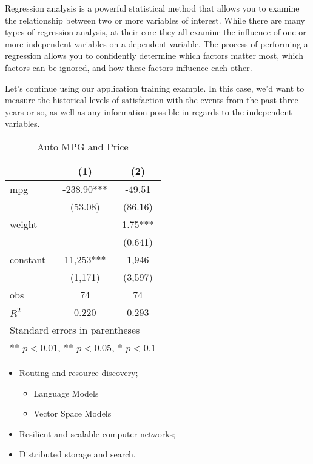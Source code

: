 \documentclass[en,hazy,blue,screen,14pt]{elegantnote}
\begin{document}
Regression analysis is a powerful statistical method that allows you to examine the relationship between two or more variables of interest. While there are many types of regression analysis, at their core they all examine the influence of one or more independent variables on a dependent variable. The process of performing a regression allows you to confidently determine which factors matter most, which factors can be ignored, and how these factors influence each other.

Let's continue using our application training example. In this case, we'd want to measure the historical levels of satisfaction with the events from the past three years or so, as well as any information possible in regards to the independent variables. 

\begin{table}[htbp]
  \small
  \centering
  \caption{Auto MPG and Price \label{tab:reg}}
    \begin{tabular}{lcc}
    \toprule
                    &       (1)         &        (2)      \\
    \midrule
    mpg             &    -238.90***     &      -49.51     \\
                    &     (53.08)       &      (86.16)    \\
    weight          &                   &      1.75***    \\
                    &                   &      (0.641)    \\
    constant        &     11,253***     &       1,946     \\
                    &     (1,171)       &      (3,597)   \\
    obs             &        74         &         74     \\
    $R^2$           &      0.220        &       0.293    \\
    \bottomrule
    \multicolumn{3}{l}{\scriptsize Standard errors in parentheses} \\
    \multicolumn{3}{l}{\scriptsize *** $p<0.01$, ** $p<0.05$, * $p<0.1$} \\
    \end{tabular}%
\end{table}%


\begin{itemize}[noitemsep]
  \item Routing and resource discovery;
    \begin{itemize} 
      \item Language Models
      \item Vector Space Models
    \end{itemize}
  \item Resilient and scalable computer networks;
  \item Distributed storage and search.
\end{itemize}
\end{document}
